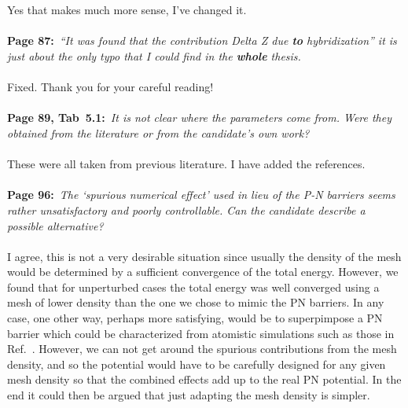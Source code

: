 \documentclass[phd, titlesmallcaps,foronline,oneside]{SNSthesis}
\begin{document}
\\\\
Yes that makes much more sense, I've changed it.
\\\\
{\bf Page 87:}~{\it ``It was found that the contribution Delta Z due {\bf to} hybridization'' it is just about the only typo that I could find in the {\bf whole} thesis.}
\\\\
Fixed. Thank you for your careful reading!
\\\\
{\bf Page 89, Tab~5.1:}~{\it It is not clear where the parameters come from. Were they obtained from the literature or from the candidate’s own work?}
\\\\
These were all taken from previous literature. I have added the references.
\\\\
{\bf Page 96:}~{\it The `spurious numerical effect' used in lieu of the P-N barriers seems rather
unsatisfactory and poorly controllable. Can the candidate describe a possible alternative?}
\\\\
I agree, this is not a very desirable situation since usually the density of the mesh would be determined by a sufficient convergence of the total energy. However, we found that for unperturbed cases the total energy was well converged using a mesh of lower density than the one we chose to mimic the PN barriers.
In any case, one other way, perhaps more satisfying, would be to superpimpose a PN barrier which could be characterized from atomistic simulations such as those in Ref.~\cite{Meyer2002}. However, we can not get around the spurious contributions from the mesh density, and so the potential would have to be carefully designed for any given mesh density so that the combined effects add up to the real PN potential. In the end it could then be argued that just adapting the mesh density is simpler.
\\\\
% 

\end{document}
